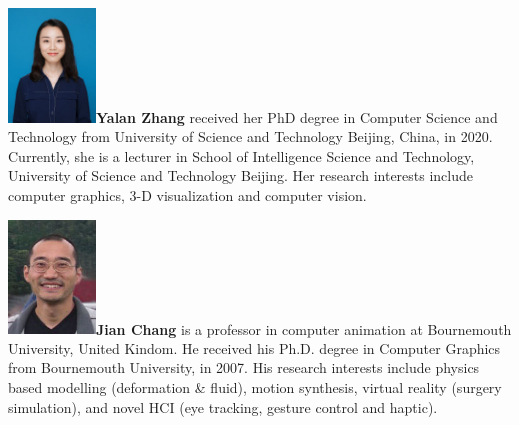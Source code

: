 \documentclass[VANCOUVER,STIX1COL]{WileyNJD-v2}
\providecommand{\DIFaddbegin}{} %
\providecommand{\DIFaddend}{} %
\providecommand{\DIFdelbegin}{} %
\providecommand{\DIFdelend}{} %
\begin{document}
\vspace{7ex}

\DIFdelbegin %
\DIFdelend \DIFaddbegin \begin{biography}{\includegraphics[width=66pt,height=86pt]{VANCOUVER/figure/photos/YalanZhang.jpg}}{\textbf{Yalan Zhang} received her PhD degree in Computer Science and Technology from University of Science and Technology Beijing, China, in 2020. Currently, she is a lecturer in School of Intelligence Science and Technology, University of Science and Technology Beijing. Her research interests include computer graphics, 3-D visualization and computer vision.}
\DIFaddend \end{biography}

\vspace{7ex}

\begin{biography}{\includegraphics[width=66pt,height=86pt]{VANCOUVER/figure/photos/JianChang.jpg}}{\textbf{Jian Chang} is a professor in  computer animation at Bournemouth University, United Kindom. He received his Ph.D. degree in Computer Graphics from Bournemouth University, in 2007. His research interests include physics based modelling (deformation \& fluid), motion synthesis, virtual reality (surgery simulation), and novel HCI (eye tracking, gesture control and haptic).}
\end{biography}

\vspace{5ex}
\end{document}
